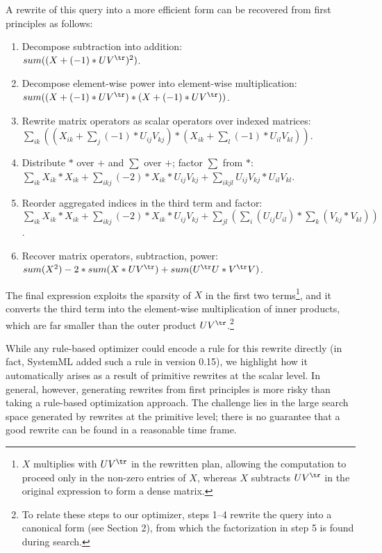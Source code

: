 A rewrite of this query into a more efficient form can be recovered from first principles as follows:
\begin{enumerate}
  \item Decompose subtraction into addition:\\ $sum((X + (-1)*UV^\tr)^2)$.
  \item Decompose element-wise power into element-wise multiplication: 
  $sum((X + (-1)*UV^\tr) * (X + (-1)*UV^\tr))$.
  \item Rewrite matrix operators as scalar operators over indexed matrices: 
  $\sum_{ik} ((X_{ik} + \sum_j (-1)*U_{ij}V_{kj}) * (X_{ik} + \sum_l (-1)*U_{il}V_{kl}))$.
  \item Distribute $*$ over $+$ and $\sum$ over $+$; factor $\sum$ from $*$: 
  $\sum_{ik} X_{ik}*X_{ik} + \sum_{ikj} (-2)*X_{ik}*U_{ij}V_{kj} + \sum_{ikjl} U_{ij}V_{kj}*U_{il}V_{kl}$.
  \item Reorder aggregated indices in the third term and factor:
  $\sum_{ik} X_{ik}*X_{ik} + \sum_{ikj} (-2)*X_{ik}*U_{ij}V_{kj} + \sum_{jl} (\sum_i (U_{ij}U_{il}) * \sum_k (V_{kj}*V_{kl}))$.
  \item Recover matrix operators, subtraction, power:\\
  $sum(X^2) - 2*sum(X*UV^\tr) + sum(U^\tr U * V^\tr V)$.
\end{enumerate}
The final expression exploits the sparsity of $X$ in the first two terms\footnote{$X$ multiplies with $UV^\tr$ in the rewritten plan, allowing the computation to proceed only in the non-zero entries of $X$, whereas $X$ subtracts $UV^\tr$ in the original expression to form a dense matrix.}, and it converts the third term into the element-wise multiplication of inner products, which are far smaller than the outer product $UV^\tr$.\footnote{To relate these steps to our optimizer, steps 1--4 rewrite the query into a canonical form (see Section 2), from which the factorization in step 5 is found during search.}

While any rule-based optimizer could encode a rule for this rewrite directly (in fact, SystemML added such a rule in version 0.15), we highlight how it automatically arises as a result of primitive rewrites at the scalar level. In general, however, generating rewrites from first principles is more risky than taking a rule-based optimization approach.  The challenge lies in the large search space generated by rewrites at the primitive level; there is no guarantee that a good rewrite can be found in a reasonable time frame.  

